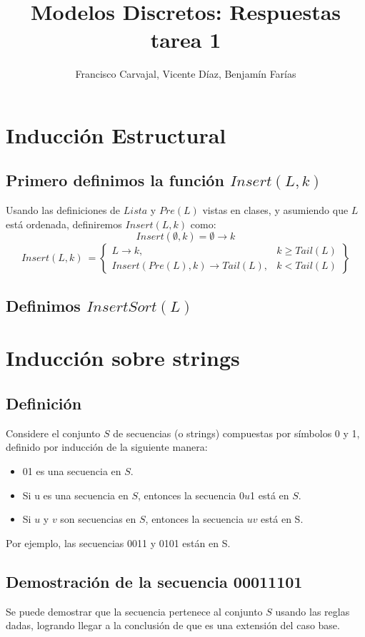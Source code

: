 \documentclass{article}
\title{Modelos Discretos: Respuestas tarea 1}
\author{Francisco Carvajal, Vicente Díaz, Benjamín Farías}
\begin{document}
\maketitle

\section{Inducción Estructural}
\subsection{Primero definimos la función $Insert(L,k)$}
Usando las definiciones de $Lista$ y $Pre(L)$ vistas en clases, y asumiendo que $L$ está ordenada, definiremos $Insert(L,k)$ como:
\[Insert(\emptyset,k) = \emptyset \rightarrow k\]
\[Insert(L,k)\ = \left\{\begin{array}{lr}
  L \rightarrow k, & k \ge Tail(L)\\
  Insert(Pre(L),k) \rightarrow Tail(L), & k < Tail(L)
\end{array}\right\}
\]

\subsection{Definimos $InsertSort(L)$}

\section{Inducción sobre strings}

\subsection{Definición}
Considere el conjunto \(S\) de secuencias (o strings) compuestas por símbolos 0 y 1, definido por inducción de la siguiente manera:
\begin{itemize}
\item 01 es una secuencia en \(S\).
\item Si u es una secuencia en \(S\), entonces la secuencia 0\(u\)1 está en \(S\).
\item Si \(u\) y \(v\) son secuencias en \(S\), entonces la secuencia \(uv\) está en S.
\end{itemize}

Por ejemplo, las secuencias 0011 y 0101 están en S.

\subsection{Demostración de la secuencia 00011101}
Se puede demostrar que la secuencia pertenece al conjunto \(S\) usando las reglas dadas, logrando llegar a la conclusión de que es una extensión del caso base.
\end{document}

